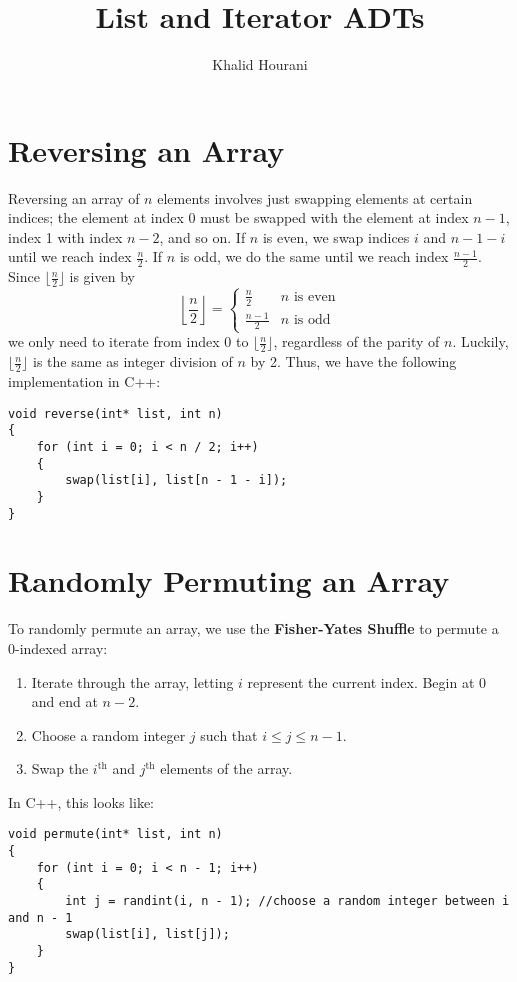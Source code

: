 \documentclass[a4paper]{article}
\title{List and Iterator ADTs}
\author{Khalid Hourani}
\begin{document}
\maketitle

\section{Reversing an Array}
Reversing an array of $n$ elements involves just swapping elements at certain indices; the element at index 0 must be swapped with the element at index $n-1$, index 1 with index $n-2$, and so on. If $n$ is even, we swap indices $i$ and $n - 1 - i$ until we reach index $\frac{n}{2}$. If $n$ is odd, we do the same until we reach index $\frac{n-1}{2}$. Since $\lfloor{\frac{n}{2}\rfloor}$ is given by  \[\left\lfloor{\frac{n}{2}}\right\rfloor=\begin{cases}\frac{n}{2} & n\text{ is even}\\\frac{n-1}{2} & n\text{ is odd}\end{cases}\] we only need to iterate from index 0 to $\lfloor{\frac{n}{2}\rfloor}$, regardless of the parity of $n$. Luckily, $\lfloor{\frac{n}{2}\rfloor}$ is the same as integer division of $n$ by 2. Thus, we have the following implementation in C++:
\begin{verbatim}
void reverse(int* list, int n)
{
	for (int i = 0; i < n / 2; i++)
	{
    	swap(list[i], list[n - 1 - i]);
	}
}
\end{verbatim}

\section{Randomly Permuting an Array}
To randomly permute an array, we use the \textbf{Fisher-Yates Shuffle} to permute a 0-indexed array: 
\begin{enumerate}
\item Iterate through the array, letting $i$ represent the current index. Begin at 0 and end at $n - 2$. 
\item Choose a random integer $j$ such that $i\leq j \leq n-1$.
\item Swap the $i^{\text{th}}$ and $j^{\text{th}}$ elements of the array. 
\end{enumerate}

In C++, this looks like:
\begin{verbatim}
void permute(int* list, int n)
{
	for (int i = 0; i < n - 1; i++)
	{
		int j = randint(i, n - 1); //choose a random integer between i and n - 1
		swap(list[i], list[j]);
	}
}
\end{verbatim}
\end{document}
